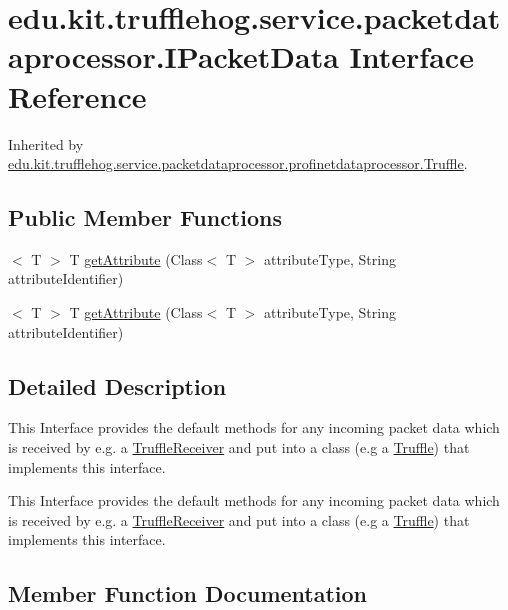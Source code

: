 \hypertarget{interfaceedu_1_1kit_1_1trufflehog_1_1service_1_1packetdataprocessor_1_1_i_packet_data}{}\section{edu.\+kit.\+trufflehog.\+service.\+packetdataprocessor.\+I\+Packet\+Data Interface Reference}
\label{interfaceedu_1_1kit_1_1trufflehog_1_1service_1_1packetdataprocessor_1_1_i_packet_data}


Inherited by \hyperlink{classedu_1_1kit_1_1trufflehog_1_1service_1_1packetdataprocessor_1_1profinetdataprocessor_1_1_truffle}{edu.\+kit.\+trufflehog.\+service.\+packetdataprocessor.\+profinetdataprocessor.\+Truffle}.

\subsection*{Public Member Functions}
\begin{DoxyCompactItemize}
\item
$<$ T $>$ T \hyperlink{interfaceedu_1_1kit_1_1trufflehog_1_1service_1_1packetdataprocessor_1_1_i_packet_data_ac86d23f76548a696f5403a354d85ee5f}{get\+Attribute} (Class$<$ T $>$ attribute\+Type, String attribute\+Identifier)
\item
$<$ T $>$ T \hyperlink{interfaceedu_1_1kit_1_1trufflehog_1_1service_1_1packetdataprocessor_1_1_i_packet_data_ac86d23f76548a696f5403a354d85ee5f}{get\+Attribute} (Class$<$ T $>$ attribute\+Type, String attribute\+Identifier)
\end{DoxyCompactItemize}


\subsection{Detailed Description}
This Interface provides the default methods for any incoming packet data which is received by e.\+g. a \hyperlink{}{Truffle\+Receiver} and put into a class (e.\+g a \hyperlink{}{Truffle}) that implements this interface.

This Interface provides the default methods for any incoming packet data which is received by e.\+g. a \hyperlink{}{Truffle\+Receiver} and put into a class (e.\+g a \hyperlink{}{Truffle}) that implements this interface. 

\subsection{Member Function Documentation}
\hypertarget{interfaceedu_1_1kit_1_1trufflehog_1_1service_1_1packetdataprocessor_1_1_i_packet_data_ac86d23f76548a696f5403a354d85ee5f}{}
